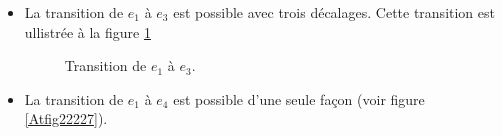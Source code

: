 \begin{Ex}
\begin{itemize}
\item La  transition de $e_{1}$ à $e_{3}$ est possible avec trois décalages. Cette transition est ullistrée à la figure \ref{Atfig22226}
\begin{figure}[!htb]
\begin{minipage}[c]{.12\linewidth}
  \centering
\begin{logicpuzzle}[rows=2,columns=7,color=cyan!100, width=750px,scale=0.5]
\framepuzzle[black!50]
\end{logicpuzzle}
\end{minipage}
\hfill
\begin{minipage}[c]{.12\linewidth}
  \centering
\begin{logicpuzzle}[rows=2,columns=7,color=cyan!100, width=750px,scale=0.5]
\framepuzzle[black!50]
\end{logicpuzzle}
\end{minipage}
\hfill
\begin{minipage}[c]{.25\linewidth}
  \centering
\begin{logicpuzzle}[rows=2,columns=7,color=cyan!100, width=750px,scale=0.5]
\framepuzzle[black!50]
\end{logicpuzzle}
\end{minipage}
\hfill
\caption{\label{Atfig22226} Transition de $e_{1}$ à $e_{3}$.}
\end{figure} 
\item  La  transition de $e_{1}$ à $e_{4}$ est possible d'une seule façon (voir figure \ref{Atfig22227}).
\begin{figure}[!htb]
\begin{minipage}[c]{.16\linewidth}
  \centering
\end{minipage}
\hfill
\begin{minipage}[c]{.66\linewidth}

\end{minipage}
\end{figure}
\end{itemize}
\end{Ex}
